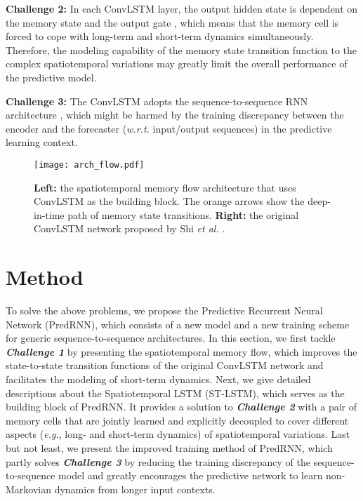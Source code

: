 \documentclass[10pt,journal,compsoc]{IEEEtran}
\let\MYoriglatexcaption\caption
\renewcommand{\caption}[2][\relax]{\MYoriglatexcaption[#2]{#2}}
\begin{document}
\textbf{Challenge 2:} In each ConvLSTM layer, the output hidden state  is dependent on the memory state  and the output gate , which means that the memory cell is forced to cope with long-term and short-term dynamics simultaneously. Therefore, the modeling capability of the memory state transition function to the complex spatiotemporal variations may greatly limit the overall performance of the predictive model.

\textbf{Challenge 3:} The ConvLSTM adopts the sequence-to-sequence RNN architecture \cite{Sutskever2014Sequence}, which might be harmed by the training discrepancy between the encoder and the forecaster (\textit{w.r.t.} input/output sequences) in the predictive learning context. 



\begin{figure*}[t]
  \centering
  \texttt{[image: arch\_flow.pdf]}
\caption{\textbf{Left:} the spatiotemporal memory flow architecture that uses ConvLSTM as the building block. The orange arrows show the deep-in-time path of memory state transitions. \textbf{Right:} the original ConvLSTM network proposed by Shi \textit{et al.} \cite{shi2015convolutional}.
  }
  \label{fig:rnn_compare}
  \vspace{5pt}
\end{figure*}



\section{Method}

To solve the above problems, we propose the Predictive Recurrent Neural Network (PredRNN), which consists of a new model and a new training scheme for generic sequence-to-sequence architectures.
In this section, we first tackle \textbf{\textit{Challenge 1}} by presenting the spatiotemporal memory flow, which improves the state-to-state transition functions of the original ConvLSTM network and facilitates the modeling of short-term dynamics.
Next, we give detailed descriptions about the Spatiotemporal LSTM (ST-LSTM), which serves as the building block of PredRNN. It provides a solution to \textbf{\textit{Challenge 2}} with a pair of memory cells that are jointly learned and explicitly decoupled to cover different aspects (\textit{e.g.}, long- and short-term dynamics) of spatiotemporal variations.
Last but not least, we present the improved training method of PredRNN, which partly solves \textbf{\textit{Challenge 3}} by reducing the training discrepancy of the sequence-to-sequence model and greatly encourages the predictive network to learn non-Markovian dynamics from longer input contexts.
\end{document}
